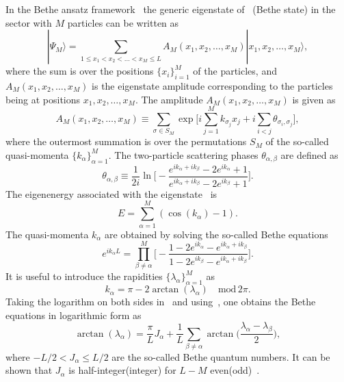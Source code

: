 \documentclass[11pt]{iopart}
\begin{document}
In the Bethe ansatz framework~\cite{bethe-1931,taka-book} the generic eigenstate 
of~ (Bethe state) in the sector with $M$ particles can be written as 
%
\begin{equation}
\label{ba-eig}
|\Psi_M\rangle=\sum\limits_{1\le x_1<x_2<\dots<x_M\le L}A_M(x_1,x_2,
\dots,x_M)|x_1,x_2,\dots,x_M\rangle,
\end{equation}
%
where the sum is over the positions $\{x_i\}_{i=1}^M$ of the particles, and $A_M(x_1,
x_2,\dots,x_M)$ is the eigenstate amplitude corresponding to the particles 
being at positions $x_1,x_2,\dots, x_M$. The amplitude $A_M(x_1,x_2,\dots, x_M)$ is 
given as 
%
\begin{equation}
\label{ba_amp}
A_M(x_1,x_2,\dots,x_M)\equiv\sum\limits_{\sigma\in S_M}\exp\Big[i
\sum\limits_{j=1}^Mk_{\sigma_j}x_j+i\sum\limits_{i<j}\theta_{\sigma_i,\sigma_j}
\Big], 
\end{equation}
%
where the outermost summation is over the permutations $S_M$ of the so-called 
quasi-momenta $\{k_\alpha\}_{\alpha=1}^M$. The two-particle scattering phases 
$\theta_{\alpha,\beta}$ are defined as 
%
\begin{equation}
\label{s_phases}
\theta_{\alpha,\beta}\equiv \frac{1}{2i}\ln\Big[-\frac{e^{ik_\alpha+ik_\beta}-
2e^{ik_\alpha}+1}{e^{ik_\alpha+ik_\beta}-2e^{ik_\beta}+1}\Big].
\end{equation}
%
The eigenenergy associated with the eigenstate~ is  
%
\begin{equation}
\label{ba-ener}
E=\sum\limits_{\alpha=1}^M(\cos(k_\alpha)-1). 
\end{equation}
%
The quasi-momenta $k_\alpha$ are obtained by solving the so-called Bethe 
equations~\cite{bethe-1931}
%
\begin{equation}
\label{ba-eq}
e^{ik_\alpha L}=\prod\limits^M_{\beta\ne\alpha}\Big[-\frac{1-2e^{
ik_\alpha}-e^{ik_\alpha+ik_\beta}}{1-2e^{ik_\beta}-e^{ik_\alpha+
ik_\beta}}\Big].
\end{equation}
%
It is useful to  introduce the rapidities $\{\lambda_\alpha\}_{\alpha=1}^M$ as 
%
\begin{equation}
\label{rap}
k_\alpha=\pi-2\arctan(\lambda_\alpha)\quad\mbox{mod}\, 2\pi.
\end{equation}
%
Taking the logarithm on both sides in~ and using~, 
one obtains the Bethe equations in logarithmic form as 
%
\begin{equation}
\label{ba-eq-log}
\arctan(\lambda_\alpha)=\frac{\pi}{L}J_\alpha+\frac{1}{L}\sum\limits_{
\beta\ne\alpha}\arctan\Big(\frac{\lambda_\alpha-\lambda_\beta}{2}\Big),
\end{equation}
%
where $-L/2<J_\alpha\le L/2$ are the so-called Bethe quantum numbers. It can 
be shown that $J_\alpha$ is half-integer(integer) for $L-M$ even(odd)~\cite{taka-book}. 
\end{document}
